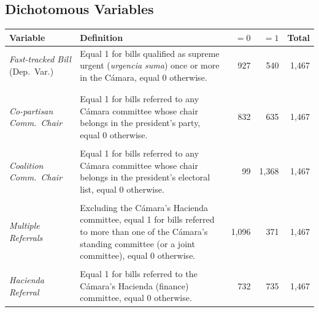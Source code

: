 \documentclass[letter,12pt]{article}
\begin{document}
\subsection{Dichotomous Variables}\label{s:descriptives-dummies}

\begin{footnotesize}
\singlespacing
\begin{tabularx}{\textwidth}{lXrrr} %
 Variable                      & Definition &   $=0$ &  $=1$ & Total \\ [.5ex] \hline
\emph{Fast-tracked Bill} (Dep.~Var.) & Equal 1 for bills qualified as supreme urgent (\emph{urgencia suma}) once or more in the Cámara, equal 0 otherwise.          &    927  &   540 & 1,467 \\ [.5ex] %
\\ [-1ex]
\\ [-1ex]
\emph{Co-partisan Comm.~Chair}       & Equal 1 for bills referred to any Cámara committee whose chair belongs in the president's party, equal 0 otherwise.          &    832 &   635 & 1,467 \\ [.5ex] %
\\ [-1ex]
\emph{Coalition Comm.~Chair}         & Equal 1 for bills referred to any Cámara committee whose chair belongs in the president's electoral list, equal 0 otherwise. &     99 & 1,368 & 1,467 \\ [.5ex] %
\\ [-1ex]
\emph{Multiple Referrals}            & Excluding the Cámara's Hacienda committee, equal 1 for bills referred to more than one of the Cámara's standing committee (or a joint committee), equal 0 otherwise. &  1,096 &   371 & 1,467 \\ [.5ex] %
\\ [-1ex]
\emph{Hacienda Referral}             & Equal 1 for bills referred to the Cámara's Hacienda (finance) committee, equal 0 otherwise.                                  &    732 &   735 & 1,467 \\ [.5ex] %

\end{tabularx}
\end{footnotesize}
\end{document}

